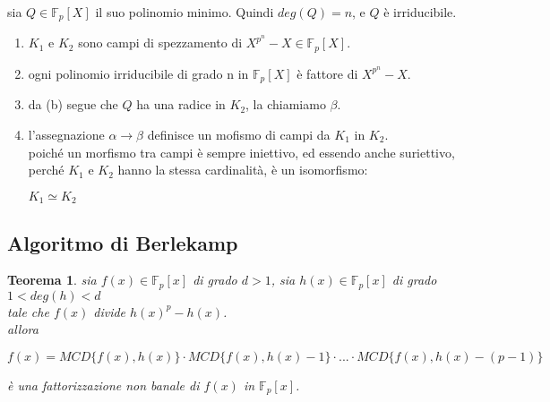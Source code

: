 \documentclass[a4paper,12pt]{article}
\theoremstyle{def}
\theoremstyle{prop}
\theoremstyle{esempio}
\theoremstyle{dimostrazione}
\theoremstyle{teo}
\newtheorem*{teorema}{Teorema}
\theoremstyle{osservazione}
\begin{document}
\begin{enumerate}
        sia \(Q \in \mathbb{F}_p[X]\) il suo polinomio minimo. Quindi \(deg(Q) = n\), e \(Q\) è irriducibile.\\
        \begin{enumerate}
            \item \(K_1\) e \(K_2\) sono campi di spezzamento di \(X^{p^n} - X \in \mathbb{F}_p[X]\).
            \item ogni polinomio irriducibile di grado n in \(\mathbb{F}_p[X]\) è fattore di \(X^{p^n} - X\).
            \item da (b) segue che \(Q\) ha una radice in \(K_2\), la chiamiamo \(\beta\).
            \item l'assegnazione \(\alpha \rightarrow \beta\) definisce un mofismo di campi da \(K_1\) in \(K_2\).\\
                poiché un morfismo tra campi è sempre iniettivo, ed essendo anche suriettivo,
                perché \(K_1\) e \(K_2\) hanno la stessa cardinalità, è un isomorfismo:
                \begin{center}
                    \(K_1 \simeq K_2\)
                \end{center}
        \end{enumerate}
\end{enumerate}

\newpage

\subsection{Algoritmo di Berlekamp}

\begin{teorema}
    sia \(f(x) \in \mathbb{F}_p[x]\) di grado \(d > 1\), sia \(h(x) \in \mathbb{F}_p[x]\) di grado \(1 < deg(h) < d\)\\
    tale che \(f(x)\) divide \(h(x)^p - h(x)\).\\
    allora
    \begin{center}
        \(f(x) = MCD\{f(x), h(x)\} \cdot MCD\{f(x), h(x) - 1\} \cdot ... \cdot MCD\{f(x), h(x) - (p - 1)\}\)
    \end{center}
    è una fattorizzazione non banale di \(f(x)\) in \(\mathbb{F}_p[x]\).
\end{teorema}
\end{document}
